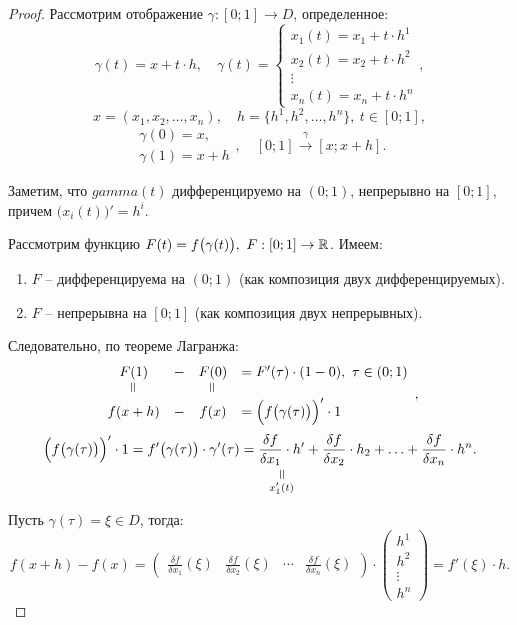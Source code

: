 \begin{proof}
    Рассмотрим отображение $ \gamma:[0;1]\rightarrow D $, определенное:
    \[
        \gamma(t) = x + t\cdot h, \quad \gamma(t) = \left\{\begin{array}{l}
            x_1(t) = x_1 + t\cdot h^1 \\
            x_2(t) = x_2 + t\cdot h^2 \\
            \vdots                    \\
            x_n(t) = x_n + t\cdot h^n
        \end{array}\right.,
    \]
    \[
        x = (x_1,x_2,\ldots,x_n),\quad h = \{h^1,h^2,\ldots,h^n\}, \ t\in [0;1],
    \]
    \[
        \begin{array}{l}
            \gamma(0) = x, \\
            \gamma(1) = x+h
        \end{array}, \quad [0;1]\overset{\gamma}{\longrightarrow}[x;x+h].
    \]

    Заметим, что $ gamma(t) $ дифференцируемо на $ (0;1) $, непрерывно на $ [0;1] $, причем $ \big(x_i(t)\big)' = h^i $.

    Рассмотрим функцию $ F(t) = f\big(\gamma(t)\big), \ F:[0;1]\rightarrow\mathbb{R} $. Имеем:
    \begin{enumerate}
        \item $ F $ -- дифференцируема на $ (0;1) $ (как композиция двух дифференцируемых).
        \item $ F $ -- непрерывна на $ [0;1] $ (как композиция двух непрерывных).
    \end{enumerate}

    Следовательно, по теореме Лагранжа:
    \[
        \begin{array}{cccl}
            F(1)    & - & F(0)    & = F'(\tau)\cdot(1-0), \ \tau \in (0;1) \\
            \verteq &   & \verteq &                                        \\
            f(x+h)  & - & f(x)    & = \Big(f\big(\gamma(\tau)\big)\Big)' \cdot 1
        \end{array},
    \]
    \[
        \Big(f\big(\gamma(\tau)\big)\Big)' \cdot 1 = f'\big(\gamma(\tau)\big) \cdot \gamma'(\tau) = \equalto{\frac{\delta f}{\delta x_1} \cdot h'}{x_1'(t)} + \frac{\delta f}{\delta x_2}\cdot h_2 + \ldots + \frac{\delta f}{\delta x_n} \cdot h^n.
    \]

    Пусть $ \gamma(\tau) = \xi \in D $, тогда:
    \[
        f(x+h) - f(x) = \left(\begin{matrix}
                \frac{\delta f}{\delta x_1}(\xi) & \frac{\delta f}{\delta x_2}(\xi) & \cdots & \frac{\delta f}{\delta x_n}(\xi)
            \end{matrix}\right) \cdot \left(\begin{matrix}
                h^1 \\ h^2 \\ \vdots \\ h^n
            \end{matrix}\right) = f'(\xi)\cdot h.
    \]
\end{proof}

